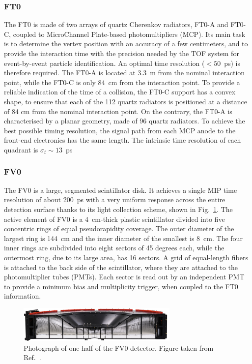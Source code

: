 \subsubsection{FT0}

The FT0 is made of two arrays of quartz Cherenkov radiators, FT0-A and FT0-C, coupled to MicroChannel Plate-based photomultipliers (MCP). Its main task is to determine the vertex position with an accuracy of a few centimeters, and to provide the interaction time with the precision needed by the TOF system for event-by-event particle identification. An optimal time resolution ($<50$~ps) is therefore required. The FT0-A is located at 3.3~m from the nominal interaction point, while the FT0-C is only 84~cm from the interaction point. To provide a reliable indication of the time of a collision, the FT0-C support has a convex shape, to ensure that each of the 112 quartz radiators is positioned at a distance of 84 cm from the nominal interaction point. On the contrary, the FT0-A is characterised by a planar geometry, made of 96 quartz radiators. To achieve the best possible timing resolution, the signal path from each MCP anode to the front-end electronics has the same length. The intrinsic time resolution of each quadrant is $\sigma_t \sim 13$~ps

\subsubsection{FV0}
The FV0 is a large, segmented scintillator disk. It achieves a single MIP time resolution of about 200~ps with a very uniform response across the entire detection surface thanks to its light collection scheme, shown in Fig.~\ref{fig:FV0}. The active element of FV0 is a 4~cm-thick plastic scintillator divided into five concentric rings of equal pseudorapidity coverage. The outer diameter of the largest ring is 144~cm and the inner diameter of the smallest is 8~cm. The four inner rings are subdivided into eight sectors of 45 degrees each, while the outermost ring, due to its large area, has 16 sectors. A grid of equal-length fibers is attached to the back side of the scintillator, where they are attached to the photomultiplier tubes (PMTs). Each sector is read out by an independent PMT to provide a minimum bias and multiplicity trigger, when coupled to the FT0 information.

\begin{figure}[htb]
    \centering
    \includegraphics[width=0.7\textwidth]{Figures/Chapter 3/FV0_Scheme.jpg}
    \caption{Photograph of one half of the FV0 detector. Figure taken from Ref.~\cite{ALICE:2023udb}.}
    \label{fig:FV0}
\end{figure}

